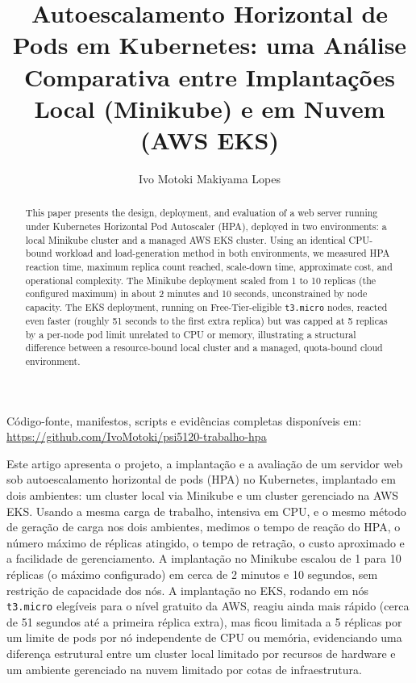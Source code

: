 \documentclass[12pt]{article}
\title{Autoescalamento Horizontal de Pods em Kubernetes: uma Análise
  Comparativa entre Implantações Local (Minikube) e em Nuvem (AWS EKS)}
\author{Ivo Motoki Makiyama Lopes\inst{1}}
\begin{document}
\maketitle

\begin{center}
\footnotesize Código-fonte, manifestos, scripts e evidências completas
disponíveis em: \url{https://github.com/IvoMotoki/psi5120-trabalho-hpa}
\end{center}

\begin{abstract}
  This paper presents the design, deployment, and evaluation of a web server
  running under Kubernetes Horizontal Pod Autoscaler (HPA), deployed in two
  environments: a local Minikube cluster and a managed AWS EKS cluster. Using
  an identical CPU-bound workload and load-generation method in both
  environments, we measured HPA reaction time, maximum replica count reached,
  scale-down time, approximate cost, and operational complexity. The Minikube
  deployment scaled from 1 to 10 replicas (the configured maximum) in about 2
  minutes and 10 seconds, unconstrained by node capacity. The EKS deployment,
  running on Free-Tier-eligible \texttt{t3.micro} nodes, reacted even faster
  (roughly 51 seconds to the first extra replica) but was capped at 5
  replicas by a per-node pod limit unrelated to CPU or memory, illustrating a
  structural difference between a resource-bound local cluster and a
  managed, quota-bound cloud environment.
\end{abstract}

\begin{resumo}
  Este artigo apresenta o projeto, a implantação e a avaliação de um servidor
  web sob autoescalamento horizontal de pods (HPA) no Kubernetes, implantado
  em dois ambientes: um cluster local via Minikube e um cluster gerenciado na
  AWS EKS. Usando a mesma carga de trabalho, intensiva em CPU, e o mesmo
  método de geração de carga nos dois ambientes, medimos o tempo de reação do
  HPA, o número máximo de réplicas atingido, o tempo de retração, o custo
  aproximado e a facilidade de gerenciamento. A implantação no Minikube
  escalou de 1 para 10 réplicas (o máximo configurado) em cerca de 2 minutos
  e 10 segundos, sem restrição de capacidade dos nós. A implantação no EKS,
  rodando em nós \texttt{t3.micro} elegíveis para o nível gratuito da AWS,
  reagiu ainda mais rápido (cerca de 51 segundos até a primeira réplica
  extra), mas ficou limitada a 5 réplicas por um limite de pods por nó
  independente de CPU ou memória, evidenciando uma diferença estrutural
  entre um cluster local limitado por recursos de hardware e um ambiente
  gerenciado na nuvem limitado por cotas de infraestrutura.
\end{resumo}
\end{document}
